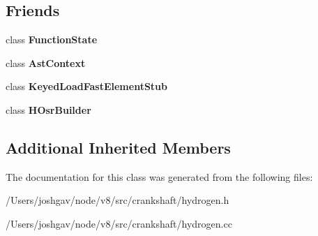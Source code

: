 \subsection*{Friends}
\begin{DoxyCompactItemize}
\item 
class {\bfseries Function\+State}\hypertarget{classv8_1_1internal_1_1_h_optimized_graph_builder_a4701e71c2466ba402928d2c2f816fb4a}{}\label{classv8_1_1internal_1_1_h_optimized_graph_builder_a4701e71c2466ba402928d2c2f816fb4a}

\item 
class {\bfseries Ast\+Context}\hypertarget{classv8_1_1internal_1_1_h_optimized_graph_builder_a5f4a1744fc5eb14be17a570d979868c4}{}\label{classv8_1_1internal_1_1_h_optimized_graph_builder_a5f4a1744fc5eb14be17a570d979868c4}

\item 
class {\bfseries Keyed\+Load\+Fast\+Element\+Stub}\hypertarget{classv8_1_1internal_1_1_h_optimized_graph_builder_a895ad073b7b9d0a6d169080daf136fcf}{}\label{classv8_1_1internal_1_1_h_optimized_graph_builder_a895ad073b7b9d0a6d169080daf136fcf}

\item 
class {\bfseries H\+Osr\+Builder}\hypertarget{classv8_1_1internal_1_1_h_optimized_graph_builder_a8ede90e072dedf7d7e7790653b851e14}{}\label{classv8_1_1internal_1_1_h_optimized_graph_builder_a8ede90e072dedf7d7e7790653b851e14}

\end{DoxyCompactItemize}
\subsection*{Additional Inherited Members}


The documentation for this class was generated from the following files\+:\begin{DoxyCompactItemize}
\item 
/\+Users/joshgav/node/v8/src/crankshaft/hydrogen.\+h\item 
/\+Users/joshgav/node/v8/src/crankshaft/hydrogen.\+cc\end{DoxyCompactItemize}
